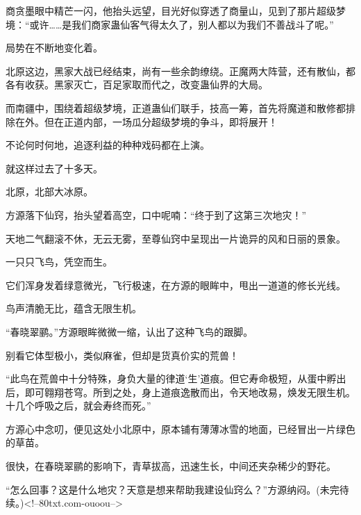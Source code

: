 \begin{this_body}
商贪墨眼中精芒一闪，他抬头远望，目光好似穿透了商量山，见到了那片超级梦境：“或许……是我们商家蛊仙客气得太久了，别人都以为我们不善战斗了呢。”

局势在不断地变化着。

北原这边，黑家大战已经结束，尚有一些余韵缭绕。正魔两大阵营，还有散仙，都各有收获。黑家灭亡，百足家取而代之，改变蛊仙界的大局。

而南疆中，围绕着超级梦境，正道蛊仙们联手，技高一筹，首先将魔道和散修都排除在外。但在正道内部，一场瓜分超级梦境的争斗，即将展开！

不论何时何地，追逐利益的种种戏码都在上演。

就这样过去了十多天。

北原，北部大冰原。

方源落下仙窍，抬头望着高空，口中呢喃：“终于到了这第三次地灾！”

天地二气翻滚不休，无云无雾，至尊仙窍中呈现出一片诡异的风和日丽的景象。

一只只飞鸟，凭空而生。

它们浑身发着绿意微光，飞行极速，在方源的眼眸中，甩出一道道的修长光线。

鸟声清脆无比，蕴含无限生机。

“春晓翠鹂。”方源眼眸微微一缩，认出了这种飞鸟的跟脚。

别看它体型极小，类似麻雀，但却是货真价实的荒兽！

“此鸟在荒兽中十分特殊，身负大量的律道‘生’道痕。但它寿命极短，从蛋中孵出后，即可翱翔苍穹。所到之处，身上道痕逸散而出，令天地改易，焕发无限生机。十几个呼吸之后，就会寿终而死。”

方源心中念叨，便见这处小北原中，原本铺有薄薄冰雪的地面，已经冒出一片绿色的草苗。

很快，在春晓翠鹂的影响下，青草拔高，迅速生长，中间还夹杂稀少的野花。

“怎么回事？这是什么地灾？天意是想来帮助我建设仙窍么？”方源纳闷。(未完待续。)<!--80txt.com-ouoou-->

\end{this_body}


